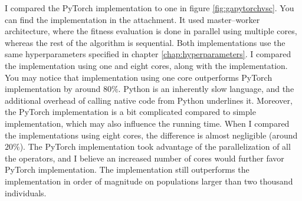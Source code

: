 I compared the PyTorch implementation to \cpp one in figure \ref{fig:gapytorchvsc}. You can find the \cpp implementation in the attachment. It used master--worker architecture, where the fitness evaluation is done in parallel using multiple cores, whereas the rest of the algorithm is sequential. Both implementations use the same hyperparameters specified in chapter \ref{chap:hyperparameters}. I compared the implementation using one and eight cores, along with the \gpu implementation. You may notice that \cpp implementation using one core outperforms PyTorch implementation by around $80\%$. Python is an inherently slow language, and the additional overhead of calling native code from Python underlines it. Moreover, the PyTorch implementation is a bit complicated compared to simple \cpp implementation, which may also influence the running time. When I compared the implementations using eight cores, the difference is almost negligible (around $20\%$). The PyTorch implementation took advantage of the parallelization of all the operators, and I believe an increased number of cores would further favor PyTorch implementation. The \gpu implementation still outperforms the \cpp implementation in order of magnitude on populations larger than two thousand individuals.

